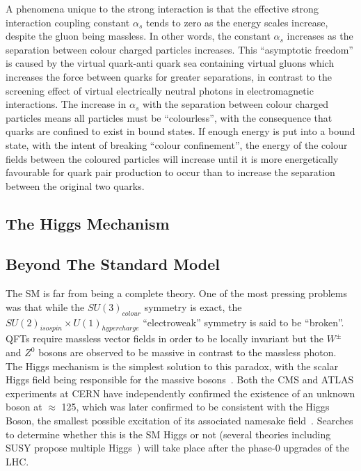 A phenomena unique to the strong interaction is that the effective strong interaction coupling constant $\alpha_{s}$ tends to zero as the energy scales increase, despite the gluon being massless. 
In other words, the constant $\alpha_{s}$ increases as the separation between colour charged particles increases. 
This ``asymptotic freedom'' is caused by the virtual quark-anti quark sea containing virtual gluons which increases the force between quarks for greater separations, in contrast to the screening effect of virtual electrically neutral photons in electromagnetic interactions. 
The increase in $\alpha_{s}$ with the separation between colour charged particles means all particles must be ``colourless'', with the consequence that quarks are confined to exist in bound states\cite{ElectroweakStrong}. 
If enough energy is put into a bound state, with the intent of breaking ``colour confinement'', the energy of the colour fields between the coloured particles will increase until it is more energetically favourable for quark pair production to occur than to increase the separation between the original two quarks\cite{Griffiths}. 

\subsection{The Higgs Mechanism}\label{sec:higgs}

\subsection{Beyond The Standard Model}\label{sec:bsm}

The SM is far from being a complete theory. 
One of the most pressing problems was that while the $SU(3)_{colour}$ symmetry is exact, the $SU(2)_{isospin} \times U(1)_{hypercharge}$ ``electroweak'' symmetry is said to be ``broken''. 
QFTs require massless vector fields in order to be locally invariant but the $W^{\pm}$ and $Z^{0}$ bosons are observed to be massive in contrast to the massless photon. 
The Higgs mechanism is the simplest solution to this paradox, with the scalar Higgs field being responsible for the massive bosons~\cite{oldcms}. 
Both the CMS and ATLAS experiments at CERN have independently confirmed the existence of an unknown boson at $\approx$ 125\GeV, which was later confirmed to be consistent with the Higgs Boson, the smallest possible excitation of its associated namesake field~\cite{HiggsCMS,HiggsATLAS}. 
Searches to determine whether this is the SM Higgs or not (several theories including SUSY propose multiple Higgs~\cite{Khalil:2003vd,Gianotti:2002xx}) will take place after the phase-0 upgrades of the LHC. 


